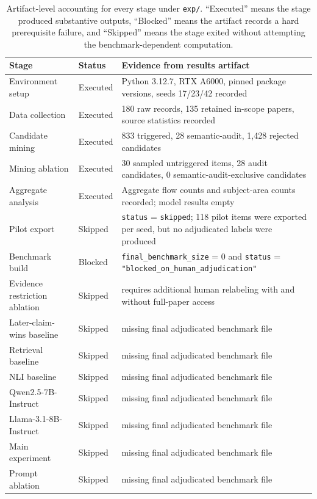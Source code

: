 \documentclass{article}
\begin{document}
\begin{table}[t]
\caption{Artifact-level accounting for every stage under \texttt{exp/}. ``Executed'' means the stage produced substantive outputs, ``Blocked'' means the artifact records a hard prerequisite failure, and ``Skipped'' means the stage exited without attempting the benchmark-dependent computation.}
\label{tab:stages}
\centering
\footnotesize
\begin{tabularx}{\textwidth}{>{\raggedright\arraybackslash}p{}>{\raggedright\arraybackslash}p{}X}
\toprule
Stage & Status & Evidence from results artifact \\
\midrule
Environment setup & Executed & Python 3.12.7, RTX A6000, pinned package versions, seeds 17/23/42 recorded \\
Data collection & Executed & 180 raw records, 135 retained in-scope papers, source statistics recorded \\
Candidate mining & Executed & 833 triggered, 28 semantic-audit, 1{,}428 rejected candidates \\
Mining ablation & Executed & 30 sampled untriggered items, 28 audit candidates, 0 semantic-audit-exclusive candidates \\
Aggregate analysis & Executed & Aggregate flow counts and subject-area counts recorded; model results empty \\
Pilot export & Skipped & \texttt{status} = \texttt{skipped}; 118 pilot items were exported per seed, but no adjudicated labels were produced \\
Benchmark build & Blocked & \texttt{final\_benchmark\_size} = 0 and \texttt{status} = \texttt{"blocked\_on\_human\_adjudication"} \\
Evidence restriction ablation & Skipped & requires additional human relabeling with and without full-paper access \\
Later-claim-wins baseline & Skipped & missing final adjudicated benchmark file \\
Retrieval baseline & Skipped & missing final adjudicated benchmark file \\
NLI baseline & Skipped & missing final adjudicated benchmark file \\
Qwen2.5-7B-Instruct & Skipped & missing final adjudicated benchmark file \\
Llama-3.1-8B-Instruct & Skipped & missing final adjudicated benchmark file \\
Main experiment & Skipped & missing final adjudicated benchmark file \\
Prompt ablation & Skipped & missing final adjudicated benchmark file \\
\bottomrule
\end{tabularx}
\end{table}
\end{document}
